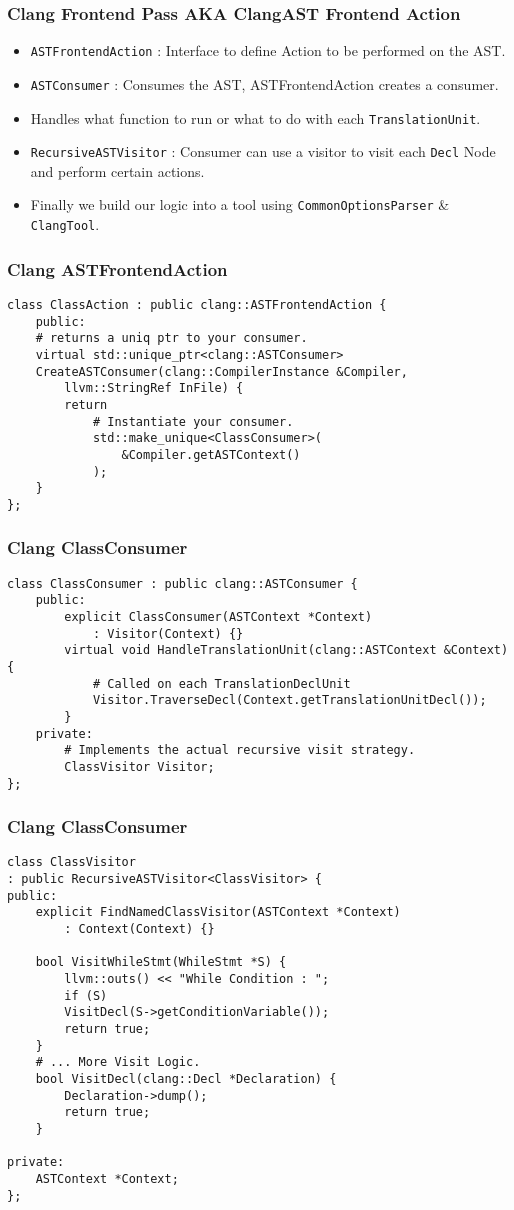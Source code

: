\documentclass{beamer}
\begin{document}
\begin{frame}
	\frametitle{Clang Frontend Pass AKA ClangAST Frontend Action}
		\begin{itemize}
			\item \texttt{ASTFrontendAction} : Interface to define Action to be performed on the AST. \pause
			\item \texttt{ASTConsumer} : Consumes the AST, ASTFrontendAction creates a consumer. \pause
			\item Handles what function to run or what to do with each \texttt{TranslationUnit}. \pause
			\item \texttt{RecursiveASTVisitor} : Consumer can use a visitor to visit each \texttt{Decl} Node and perform certain actions. \pause
			\item Finally we build our logic into a tool using \texttt{CommonOptionsParser} \& \texttt{ClangTool}. \pause
		\end{itemize}
\end{frame}

\begin{frame}[fragile]
	\frametitle{Clang ASTFrontendAction}
		\begin{verbatim}
class ClassAction : public clang::ASTFrontendAction {
	public:
	# returns a uniq ptr to your consumer.
	virtual std::unique_ptr<clang::ASTConsumer>
	CreateASTConsumer(clang::CompilerInstance &Compiler, 
		llvm::StringRef InFile) {
		return 
			# Instantiate your consumer. 
			std::make_unique<ClassConsumer>(
				&Compiler.getASTContext()
			);
	}
};
	\end{verbatim}
\end{frame}

\begin{frame}[fragile]
	\frametitle{Clang ClassConsumer}
	\begin{verbatim}
class ClassConsumer : public clang::ASTConsumer {
	public:
		explicit ClassConsumer(ASTContext *Context) 
			: Visitor(Context) {}
		virtual void HandleTranslationUnit(clang::ASTContext &Context) {
			# Called on each TranslationDeclUnit
			Visitor.TraverseDecl(Context.getTranslationUnitDecl());
		}
	private:
		# Implements the actual recursive visit strategy.
		ClassVisitor Visitor;
};
	\end{verbatim}
\end{frame}

\begin{frame}[fragile]
	\frametitle{Clang ClassConsumer}
	\begin{verbatim}
class ClassVisitor
: public RecursiveASTVisitor<ClassVisitor> {
public:
	explicit FindNamedClassVisitor(ASTContext *Context) 
		: Context(Context) {}
	
	bool VisitWhileStmt(WhileStmt *S) {
		llvm::outs() << "While Condition : ";
		if (S)
		VisitDecl(S->getConditionVariable());
		return true;
	}
	# ... More Visit Logic. 
	bool VisitDecl(clang::Decl *Declaration) {
		Declaration->dump();
		return true;
	}

private:
	ASTContext *Context;
};
	\end{verbatim}
\end{frame}
\end{document}
